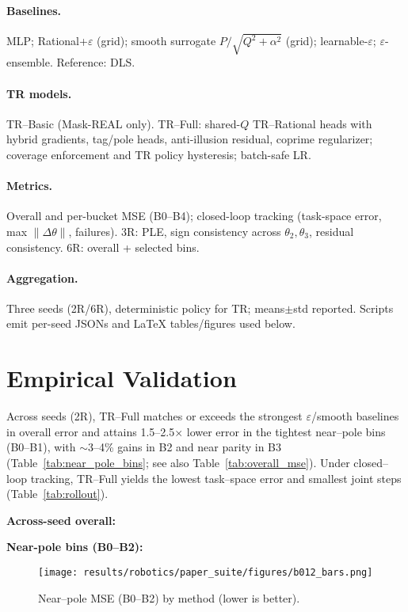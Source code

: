 \documentclass[11pt,twoside]{article}
\begin{document}
\paragraph{Baselines.} MLP; Rational+$\varepsilon$ (grid); smooth surrogate $P/\sqrt{Q^2+\alpha^2}$ (grid); learnable-$\varepsilon$; $\varepsilon$-ensemble. Reference: DLS.
\paragraph{TR models.} TR--Basic (Mask-REAL only). TR--Full: shared-$Q$ TR--Rational heads with hybrid gradients, tag/pole heads, anti-illusion residual, coprime regularizer; coverage enforcement and TR policy hysteresis; batch-safe LR.
\paragraph{Metrics.} Overall and per-bucket MSE (B0--B4); closed-loop tracking (task-space error, max $\|\Delta\theta\|$, failures). 3R: PLE, sign consistency across $\theta_2,\theta_3$, residual consistency. 6R: overall + selected bins.
\paragraph{Aggregation.} Three seeds (2R/6R), deterministic policy for TR; means$\pm$std reported. Scripts emit per-seed JSONs and LaTeX tables/figures used below.

\section{Empirical Validation}
Across seeds (2R), TR--Full matches or exceeds the strongest $\varepsilon$/smooth baselines in overall error and attains 1.5--2.5$\times$ lower error in the tightest near--pole bins (B0--B1), with $\sim$3--4\% gains in B2 and near parity in B3 (Table~\ref{tab:near_pole_bins}; see also Table~\ref{tab:overall_mse}). Under closed--loop tracking, TR--Full yields the lowest task--space error and smallest joint steps (Table~\ref{tab:rollout}).

\noindent\textbf{Across-seed overall:} 

\noindent\textbf{Near-pole bins (B0--B2):} 

\begin{figure}[h]
  \centering
  \texttt{[image: results/robotics/paper\_suite/figures/b012\_bars.png]}
  \caption{Near--pole MSE (B0--B2) by method (lower is better).}
  \label{fig:b012bars-paper}
\end{figure}
\end{document}
